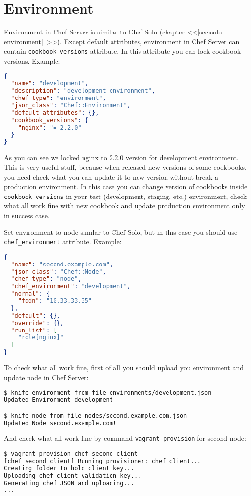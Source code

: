 \section{Environment}
\label{sec:server-environment}

Environment in Chef Server is similar to Chef Solo (chapter <<\ref{sec:solo-environment}~>>). Except default attributes, environment in Chef Server can contain \lstinline!cookbook_versions! attribute. In this attribute you can lock cookbook versions. Example:

\begin{lstlisting}[language=JSON,label=lst:my-serer-cloud-environment1,title=my-server-cloud/environments/development.json]
{
  "name": "development",
  "description": "development environment",
  "chef_type": "environment",
  "json_class": "Chef::Environment",
  "default_attributes": {},
  "cookbook_versions": {
    "nginx": "= 2.2.0"
  }
}
\end{lstlisting}

As you can see we locked nginx to 2.2.0 version for development environment. This is very useful stuff, because when released new versions of some cookbooks, you need check what you can update it to new version without break a production environment. In this case you can change version of cookbooks inside \lstinline!cookbook_versions! in your test (development, staging, etc.) environment, check what all work fine with new cookbook and update production environment only in success case.

Set environment to node similar to Chef Solo, but in this case you should use \lstinline!chef_environment! attribute. Example:

\begin{lstlisting}[language=JSON,label=lst:my-serer-cloud-environment2,title=my-server-cloud/nodes/second.example.com.json]
{
  "name": "second.example.com",
  "json_class": "Chef::Node",
  "chef_type": "node",
  "chef_environment": "development",
  "normal": {
    "fqdn": "10.33.33.35"
  },
  "default": {},
  "override": {},
  "run_list": [
    "role[nginx]"
  ]
}
\end{lstlisting}

To check what all work fine, first of all you should upload you environment and update node in Chef Server:

\begin{lstlisting}[language=Bash,label=lst:my-serer-cloud-environment3]
$ knife environment from file environments/development.json
Updated Environment development

$ knife node from file nodes/second.example.com.json
Updated Node second.example.com!
\end{lstlisting}

And check what all work fine by command \lstinline!vagrant provision! for second node:

\begin{lstlisting}[language=Bash,label=lst:my-serer-cloud-environment4]
$ vagrant provision chef_second_client
[chef_second_client] Running provisioner: chef_client...
Creating folder to hold client key...
Uploading chef client validation key...
Generating chef JSON and uploading...
...
\end{lstlisting}
